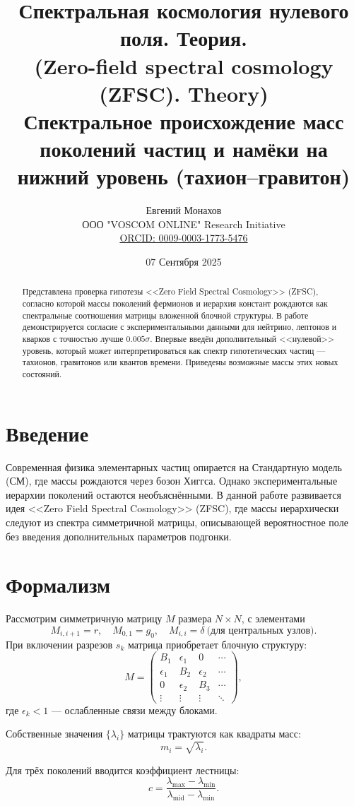 \documentclass[12pt,a4paper]{article}
\title{Спектральная космология нулевого поля. Теория.\\
(Zero-field spectral cosmology (ZFSC). Theory)\\
Спектральное происхождение масс поколений частиц и намёки на нижний уровень (тахион--гравитон)}
\author{Евгений Монахов \\ ООО "VOSCOM ONLINE" Research Initiative \\ \href{https://orcid.org/0009-0003-1773-5476}{ORCID: 0009-0003-1773-5476}}
\date{07 Сентября 2025}
\begin{document}
\maketitle

\begin{abstract}
Представлена проверка гипотезы <<Zero Field Spectral Cosmology>> (ZFSC), согласно которой массы поколений фермионов и иерархия констант рождаются как спектральные соотношения матрицы вложенной блочной структуры. 
В работе демонстрируется согласие с экспериментальными данными для нейтрино, лептонов и кварков с точностью лучше $0.005\sigma$. 
Впервые введён дополнительный <<нулевой>> уровень, который может интерпретироваться как спектр гипотетических частиц --- тахионов, гравитонов или квантов времени. 
Приведены возможные массы этих новых состояний. 
\end{abstract}

\section{Введение}
Современная физика элементарных частиц опирается на Стандартную модель (СМ), где массы рождаются через бозон Хиггса. Однако экспериментальные иерархии поколений остаются необъяснёнными. 
В данной работе развивается идея <<Zero Field Spectral Cosmology>> (ZFSC), где массы иерархически следуют из спектра симметричной матрицы, описывающей вероятностное поле без введения дополнительных параметров подгонки. 

\section{Формализм}
Рассмотрим симметричную матрицу $M$ размера $N\times N$, с элементами
\[
M_{i,i+1} = r, \quad M_{0,1} = g_0, \quad M_{i,i} = \delta \ \text{(для центральных узлов)}.
\]
При включении разрезов $s_k$ матрица приобретает блочную структуру:
\[
M = \begin{pmatrix}
B_1 & \epsilon_1 & 0 & \cdots \\
\epsilon_1 & B_2 & \epsilon_2 & \cdots \\
0 & \epsilon_2 & B_3 & \cdots \\
\vdots & \vdots & \vdots & \ddots
\end{pmatrix},
\]
где $\epsilon_k < 1$ --- ослабленные связи между блоками. 

Собственные значения $\{\lambda_i\}$ матрицы трактуются как квадраты масс:
\[
m_i = \sqrt{\lambda_i}.
\]

Для трёх поколений вводится коэффициент лестницы:
\[
c = \frac{\lambda_{\max} - \lambda_{\min}}{\lambda_{\text{mid}} - \lambda_{\min}}.
\]
\end{document}
